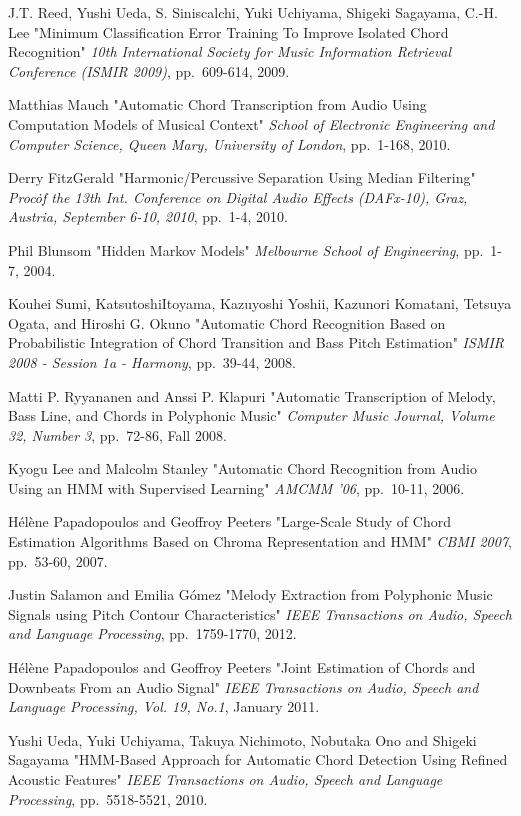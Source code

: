 \documentclass{article}
\begin{document}
\begin{thebibliography}{citations}
J.T. Reed, Yushi Ueda, S. Siniscalchi, Yuki Uchiyama, Shigeki Sagayama, C.-H. Lee
"Minimum Classification Error Training To Improve Isolated Chord Recognition"
{\it 10th International Society for Music Information Retrieval Conference (ISMIR 2009)},
pp.~609-614, 2009.

Matthias Mauch
"Automatic Chord Transcription from Audio Using Computation Models of Musical Context"
{\it School of Electronic Engineering and Computer Science, Queen Mary, University of London},
pp.~1-168, 2010.

Derry FitzGerald
"Harmonic/Percussive Separation Using Median Filtering"
{\it Proc\. of the 13th Int. Conference on Digital Audio Effects (DAFx-10), Graz, Austria, September 6-10, 2010},
pp.~1-4, 2010.

Phil Blunsom
"Hidden Markov Models"
{\it Melbourne School of Engineering},
pp.~1-7, 2004.

Kouhei Sumi, KatsutoshiItoyama, Kazuyoshi Yoshii, Kazunori Komatani, Tetsuya Ogata, and Hiroshi G. Okuno
"Automatic Chord Recognition Based on Probabilistic Integration of Chord Transition and Bass Pitch Estimation"
{\it ISMIR 2008 - Session 1a - Harmony},
pp.~39-44, 2008.

Matti P. Ryyananen and Anssi P. Klapuri
"Automatic Transcription of Melody, Bass Line, and Chords in Polyphonic Music"
{\it Computer Music Journal, Volume 32, Number 3},
pp.~72-86, Fall 2008.

Kyogu Lee and Malcolm Stanley
"Automatic Chord Recognition from Audio Using an HMM with Supervised Learning"
{\it AMCMM '06},
pp.~10-11, 2006.

Hélène Papadopoulos and Geoffroy Peeters
"Large-Scale Study of Chord Estimation Algorithms Based on Chroma Representation and HMM"
{\it CBMI 2007},
pp.~53-60, 2007.

Justin Salamon and Emilia G{\'o}mez
"Melody Extraction from Polyphonic Music Signals using Pitch Contour Characteristics"
{\it IEEE Transactions on Audio, Speech and Language Processing},
pp.~1759-1770, 2012.

Hélène Papadopoulos and Geoffroy Peeters
"Joint Estimation of Chords and Downbeats From an Audio Signal"
{\it IEEE Transactions on Audio, Speech and Language Processing, Vol. 19, No.1},
January 2011.

Yushi Ueda, Yuki Uchiyama, Takuya Nichimoto, Nobutaka Ono and Shigeki Sagayama
"HMM-Based Approach for Automatic Chord Detection Using Refined Acoustic Features"
{\it IEEE Transactions on Audio, Speech and Language Processing},
pp.~5518-5521, 2010.


\end{thebibliography}
\end{document}
